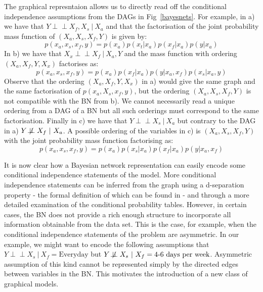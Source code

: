 \documentclass[runningheads]{llncs}
\newcommand{\ind}{\perp\!\!\!\!\perp}
\newcommand{\notind}{\not\!\perp\!\!\!\perp}
\begin{document}
The graphical represntaion allows us to directly read off the conditional independence assumptions from the DAGs in Fig~\ref{bayesnets}. For example, in a) we have that $Y \ind X_f, X_s \ | \ X_a$ and that the factorisation of the joint probability mass function of $(X_a, X_s, X_f, Y)$ is given by:
\[p(x_a, x_s, x_f, y) = p(x_a)p(x_t|x_a)p(x_f|x_a)p(y|x_a)\]
In b) we have that $X_x \ind X_f \ | \ X_a, Y$ and the mass function with ordering $(X_a, X_f, Y, X_x)$ factorises as:
\[p(x_a, x_s, x_f, y) = p(x_a)p(x_f|x_a)p(y|x_a, x_f)p(x_s|x_a, y)\]
Observe that the ordering $(X_a, X_f, Y, X_x)$ in a) would give the same graph and the same factorisation of $p(x_a, X_s, x_f, y)$, but the ordering $(X_a, X_s, X_f, Y)$ is not compatible with the BN from b). We cannot necessarily read a unique ordering from a DAG of a BN but all such orderings must correspond to the same factorisation.
Finally in c) we have that $Y \ind X_s \ | \ X_a$  but contrary to the DAG in a) $Y \notind X_f\ | \ X_a$. A possible ordering of the variables in c) is $(X_a, X_s, X_f, Y)$ with the joint probability mass function factorising as:
\[p(x_a, x_s, x_f, y) = p(x_a)p(x_s|x_a)p(x_f|x_a)p(y|x_a, x_f)\]

It is now clear how a Bayesian network representation can easily encode some conditional independence statements of the model. More conditional independence statements can be inferred from the graph using a d-separation property - the formal definition of which can be found in \cite{} - and through a more detailed examination of the conditional probability tables.
However, in certain cases, the BN does not provide a rich enough structure to incorporate all information obtainable from the data set. This is the case, for example, when the conditional independence statements of the problem are asymmetric. In our example, we might want to encode the following assumptions that $Y \ind X_s\ | \ X_f = \text{Everyday}$ but $Y \notind X_s\ | \ X_f = \text{4-6 days per week}$. Asymmetric assumption of this kind cannot be represented simply by the directed edges between variables in the BN. This motivates the introduction of a new class of graphical models. 

%
%
\end{document}
